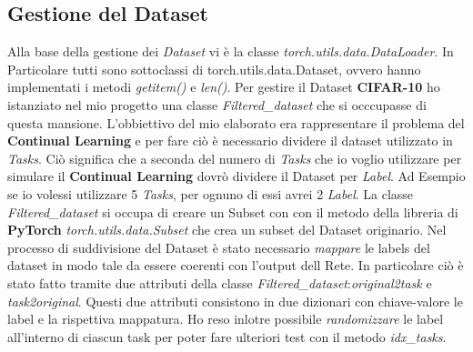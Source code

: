 \subsection{Gestione del Dataset}
Alla base della gestione dei \textit{Dataset} vi è la classe \textit{torch.utils.data.DataLoader}.
In Particolare tutti  sono sottoclassi di torch.utils.data.Dataset, ovvero hanno implementati i metodi \textit{getitem()} e \textit{len()}.
\newline
Per gestire il Dataset \textbf{CIFAR-10} ho istanziato nel mio progetto una classe \textit{Filtered\_dataset} che si occcupasse di questa mansione.
L'obbiettivo del mio elaborato era rappresentare il problema del \textbf{Continual Learning} e per fare ciò è necessario dividere il dataset utilizzato in \textit{Tasks}.
Ciò significa che a seconda del numero di \textit{Tasks} che io voglio utilizzare per simulare il \textbf{Continual Learning}
dovrò dividere il Dataset per \textit{Label}. Ad Esempio se io volessi utilizzare 5 \textit{Tasks}, per ognuno di essi avrei 2 \textit{Label}.\newline
La classe \textit{Filtered\_dataset} si occupa di creare un Subset con con il metodo della libreria di \textbf{PyTorch} \textit{torch.utils.data.Subset} che crea un subset del Dataset originario.\newline
Nel processo di suddivisione del Dataset è stato necessario \textit{mappare} le labels del dataset in modo tale da essere coerenti con l'output dell Rete. In particolare ciò è stato fatto tramite due attributi della classe \textit{Filtered\_dataset}:\textit{original2task} e \textit{task2original}. Questi due attributi consistono in due dizionari con chiave-valore le label e la rispettiva mappatura.
Ho reso inlotre possibile \textit{randomizzare} le label all'interno di ciascun task per poter fare ulteriori test con il metodo \textit{idx\_tasks}.
\newline
